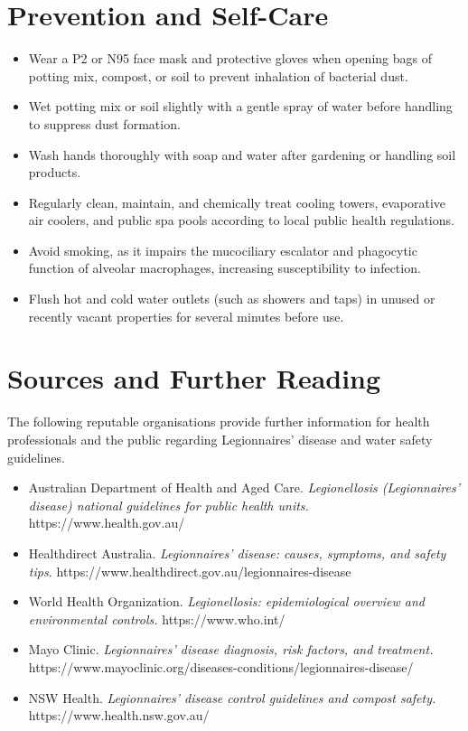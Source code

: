 \section*{Prevention and Self-Care}
\begin{itemize}
    \item Wear a P2 or N95 face mask and protective gloves when opening bags of potting mix, compost, or soil to prevent inhalation of bacterial dust.
    \item Wet potting mix or soil slightly with a gentle spray of water before handling to suppress dust formation.
    \item Wash hands thoroughly with soap and water after gardening or handling soil products.
    \item Regularly clean, maintain, and chemically treat cooling towers, evaporative air coolers, and public spa pools according to local public health regulations.
    \item Avoid smoking, as it impairs the mucociliary escalator and phagocytic function of alveolar macrophages, increasing susceptibility to infection.
    \item Flush hot and cold water outlets (such as showers and taps) in unused or recently vacant properties for several minutes before use.
\end{itemize}

\section*{Sources and Further Reading}
The following reputable organisations provide further information for health professionals and the public regarding Legionnaires' disease and water safety guidelines.

\begin{itemize}
    \item Australian Department of Health and Aged Care. \textit{Legionellosis (Legionnaires' disease) national guidelines for public health units.} https://www.health.gov.au/
    \item Healthdirect Australia. \textit{Legionnaires' disease: causes, symptoms, and safety tips.} https://www.healthdirect.gov.au/legionnaires-disease
    \item World Health Organization. \textit{Legionellosis: epidemiological overview and environmental controls.} https://www.who.int/
    \item Mayo Clinic. \textit{Legionnaires' disease diagnosis, risk factors, and treatment.} https://www.mayoclinic.org/diseases-conditions/legionnaires-disease/
    \item NSW Health. \textit{Legionnaires' disease control guidelines and compost safety.} https://www.health.nsw.gov.au/
\end{itemize}
